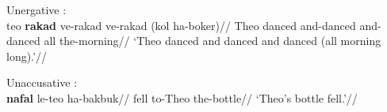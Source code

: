 	\a Unergative {\tkal}:\\
	\begingl
		\gla teo \textbf{rakad} ve-rakad ve-rakad (kol ha-boker)//
		\glb Theo danced and-danced and-danced all the-morning//
		\glft `Theo danced and danced and danced (all morning long).'//
	\endgl

	\a Unaccusative {\tkal}:\\
	\begingl
		\gla \textbf{nafal} le-teo ha-bakbuk//
		\glb fell to-Theo the-bottle//
		\glft `Theo's bottle fell.'//
	\endgl
	
\xe



